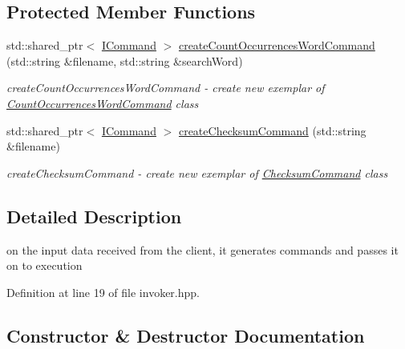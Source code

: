 \subsection*{Protected Member Functions}
\begin{DoxyCompactItemize}
\item 
std\+::shared\+\_\+ptr$<$ \hyperlink{classtwo__gis__test_1_1command__handler_1_1_i_command}{I\+Command} $>$ \hyperlink{classtwo__gis__test_1_1command__handler_1_1_invoker_aaa8657d1d2b7724976ddbaca0817415d}{create\+Count\+Occurrences\+Word\+Command} (std\+::string \&filename, std\+::string \&search\+Word)
\begin{DoxyCompactList}\small\item\em create\+Count\+Occurrences\+Word\+Command -\/ create new exemplar of \hyperlink{classtwo__gis__test_1_1command__handler_1_1_count_occurrences_word_command}{Count\+Occurrences\+Word\+Command} class \end{DoxyCompactList}\item 
std\+::shared\+\_\+ptr$<$ \hyperlink{classtwo__gis__test_1_1command__handler_1_1_i_command}{I\+Command} $>$ \hyperlink{classtwo__gis__test_1_1command__handler_1_1_invoker_a9ad77345397bfea08fe5319388fcd91a}{create\+Checksum\+Command} (std\+::string \&filename)
\begin{DoxyCompactList}\small\item\em create\+Checksum\+Command -\/ create new exemplar of \hyperlink{classtwo__gis__test_1_1command__handler_1_1_checksum_command}{Checksum\+Command} class \end{DoxyCompactList}\end{DoxyCompactItemize}


\subsection{Detailed Description}
on the input data received from the client, it generates commands and passes it on to execution 

Definition at line 19 of file invoker.\+hpp.



\subsection{Constructor \& Destructor Documentation}
